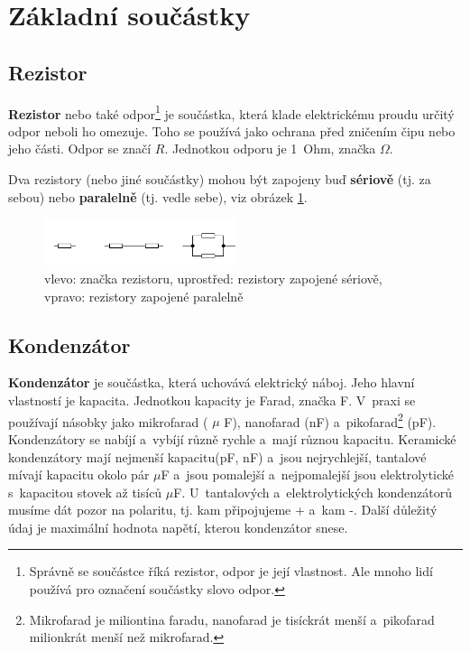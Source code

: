 
\label{elektronika}

\section{Základní součástky} 

\subsection{Rezistor}

{\bf Rezistor}  nebo také odpor\footnote{Správně se součástce říká rezistor, odpor je její vlastnost.
	 Ale mnoho lidí používá pro označení součástky slovo odpor.} je součástka, která klade elektrickému proudu  určitý odpor neboli ho omezuje. 
	Toho se používá jako ochrana před zničením čipu nebo jeho části. Odpor se značí $R$. Jednotkou odporu je 1~Ohm, značka $\Omega$. 

\hypertarget{serie}{} Dva rezistory (nebo jiné součástky) mohou být zapojeny buď 
 {\bf sériově}
 (tj. za sebou) nebo {\bf paralelně} (tj. vedle sebe), viz obrázek \ref{fig:rezistory}. 

\begin{figure}[h]
	\begin{center}
	\includegraphics[width=0.5\textwidth]{soubory/rezistory.jpg}		
	\end{center}
	\caption{ vlevo: značka rezistoru, uprostřed: rezistory zapojené sériově, vpravo: rezistory zapojené paralelně} 
	\label{fig:rezistory}
\end{figure}


\subsection{Kondenzátor}

{\bf Kondenzátor} je součástka, která uchovává elektrický náboj. 
Jeho hlavní vlastností je kapacita. Jednotkou kapacity je Farad, značka F. 
V~praxi se používají násobky jako mikrofarad ( $\mu$ F), nanofarad (nF) a~pikofarad\footnote{Mikrofarad je miliontina faradu,
	 nanofarad je tisíckrát menší a~pikofarad milionkrát menší než mikrofarad.} (pF). 
	Kondenzátory se nabíjí a~vybíjí různě rychle a~mají různou kapacitu. Keramické kondenzátory 
  mají nejmenší kapacitu(pF, nF) a~jsou nejrychlejší, tantalové  
 mívají kapacitu okolo pár $\mu$F a~jsou pomalejší a~nejpomalejší 
jsou elektrolytické s~kapacitou stovek až tisíců $\mu$F. 
U~tantalových a~elektrolytických kondenzátorů musíme dát pozor na polaritu, tj. kam připojujeme + a~kam -. 
Další důležitý údaj je maximální hodnota napětí, kterou kondenzátor snese. 

